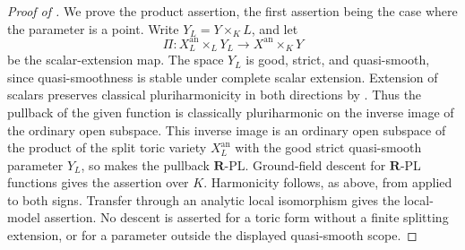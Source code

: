 \begin{proof}[Proof of ]
We prove the product assertion, the first assertion being the case where
the parameter is a point.  Write \(Y_L=Y\times_KL\), and let
\[
 \Pi:X_L^{\mathrm{an}}\times_LY_L
       \longrightarrow X^{\mathrm{an}}\times_KY
\]
be the scalar-extension map.  The space \(Y_L\) is good, strict, and
quasi-smooth, since quasi-smoothness is stable under complete scalar
extension.  Extension of scalars preserves classical pluriharmonicity in
both directions by \cite[Proposition~7.2(6)]{GR25Classical}.  Thus the
pullback of the given function is classically pluriharmonic on the inverse
image of the ordinary open subspace.  This inverse image is an ordinary open
subspace of the product of the split toric variety \(X_L^{\mathrm{an}}\)
with the good strict quasi-smooth parameter \(Y_L\), so
 makes the pullback
\(\mathbf R\)-PL.  Ground-field descent for \(\mathbf R\)-PL functions
\cite[Corollary~5.12]{GJR26} gives the assertion over \(K\).
Harmonicity follows, as above, from
\cite[Theorem~4.3]{GR25Classical} applied to both signs.  Transfer through
an analytic local isomorphism gives the local-model assertion.  No descent
is asserted for a toric form without a finite splitting extension, or for a
parameter outside the displayed quasi-smooth scope.
\end{proof}
